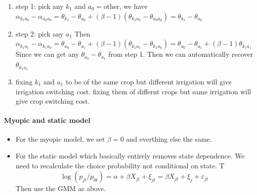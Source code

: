 \documentclass[12pt]{article}[margin=1in]
\begin{document}
\begin{enumerate}
    \item step 1: pick any $k_1$ and $a_0 = \text{other}$, we have $\alpha_{k_1 a_0}-\alpha_{a_0 a_0} = \theta_{k_1} - \theta_{a_0} + (\beta-1)(\theta_{k_1 a_0} - \theta_{a_0 a_0}) = \theta_{k_1} - \theta_{a_0}$
    \item step 2: pick any $a_1$  Then $\alpha_{k_1 a_1}-\alpha_{k_1 a_0} = \theta_{a_0}- \theta_{a_1} + (\beta -1)(\theta_{k_1 a_1 }-\theta_{k_1 a_0}) = \theta_{a_0}- \theta_{a_1} + (\beta -1)\theta_{k_1 a_1 }$
          Since we can get any $\theta_{a_0}- \theta_{a_1}$ from step 1. Then we can automatically recover $\theta_{k_1a_1}$
    \item fixing $k_1$ and $a_1$ to be of the same crop but different irrigation will give irrigation switching cost. fixing them of differnt crops but same irrigation will give crop switching cost.
\end{enumerate}

\paragraph{Myopic and static model}
\begin{itemize}
    \item For the myopic model, we set $\beta=0$ and everthing else the same.
    \item For the static model which basically entirely removes state dependence. We need to recalculate the choice probability not conditional on state. T
          $$ \log(p_{jt}/p_{0t}) = \alpha + \beta X_{jt} + \xi_{jt} = \beta X_{jt}+\xi_j + \varepsilon_{jt}$$
          Then use the GMM as above. 
\end{itemize}



\end{document}

